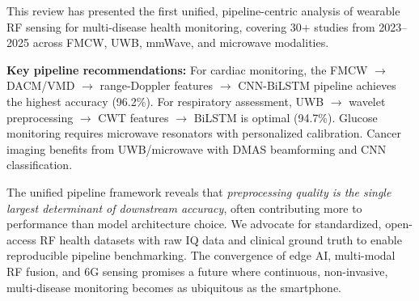 \documentclass[journal,twoside]{IEEEtran}
\begin{document}
This review has presented the first unified, pipeline-centric analysis of wearable RF sensing for multi-disease health monitoring, covering 30+ studies from 2023--2025 across FMCW, UWB, mmWave, and microwave modalities.

\textbf{Key pipeline recommendations:} For cardiac monitoring, the FMCW $\to$ DACM/VMD $\to$ range-Doppler features $\to$ CNN-BiLSTM pipeline achieves the highest accuracy (96.2\%). For respiratory assessment, UWB $\to$ wavelet preprocessing $\to$ CWT features $\to$ BiLSTM is optimal (94.7\%). Glucose monitoring requires microwave resonators with personalized calibration. Cancer imaging benefits from UWB/microwave with DMAS beamforming and CNN classification.

The unified pipeline framework reveals that \emph{preprocessing quality is the single largest determinant of downstream accuracy}, often contributing more to performance than model architecture choice. We advocate for standardized, open-access RF health datasets with raw IQ data and clinical ground truth to enable reproducible pipeline benchmarking. The convergence of edge AI, multi-modal RF fusion, and 6G sensing promises a future where continuous, non-invasive, multi-disease monitoring becomes as ubiquitous as the smartphone.
\end{document}
